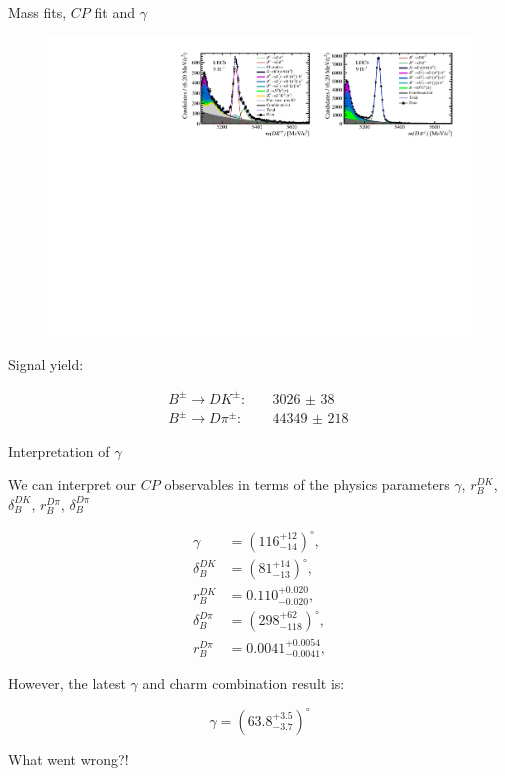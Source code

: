 \documentclass{beamer}
\begin{document}
\begin{frame}{Mass fits, $C\!P$ fit and $\gamma$}
  \begin{figure}
    \centering
    \includegraphics[width = 1.0\textwidth]{Plots/d2kkpipi_fiveL_allDP.pdf}
  \end{figure}
  \begin{center}
    Signal yield:
  \end{center}
  \vspace{-0.3cm}
  \begin{align*}
    B^\pm\to DK^\pm:&\quad \SI{3026(38)}{} \\
    B^\pm\to D\pi^\pm:&\quad \SI{44349(218)}{}
  \end{align*}
\end{frame}

\begin{frame}{Interpretation of $\gamma$}
  \begin{center}
    \Large We can interpret our $C\!P$ observables in terms of the physics parameters $\gamma$, $r_B^{DK}$, $\delta_B^{DK}$, $r_B^{D\pi}$, $\delta_B^{D\pi}$
  \end{center}
  \begin{align*}
    \gamma &= (116^{+12}_{-14})^\circ, \\
    \delta_B^{DK} &= (81^{+14}_{-13})^\circ, \\
    r_B^{DK} &= 0.110^{+0.020}_{-0.020}, \\
    \delta_B^{D\pi} &= (298^{+62}_{-118})^\circ, \\
    r_B^{D\pi} &= 0.0041^{+0.0054}_{-0.0041},
  \end{align*}
  \begin{center}
    \large However, the latest $\gamma$ and charm combination result is:
  \end{center}
  \begin{equation*}
    \gamma = (63.8^{+3.5}_{-3.7})^\circ
  \end{equation*}
  \begin{center}
    \large What went wrong?!
  \end{center}  
\end{frame}
\end{document}
